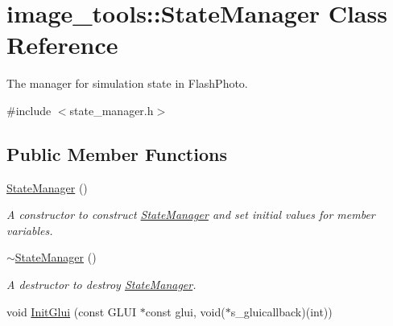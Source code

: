 \hypertarget{classimage__tools_1_1StateManager}{}\section{image\+\_\+tools\+:\+:State\+Manager Class Reference}
\label{classimage__tools_1_1StateManager}


The manager for simulation state in Flash\+Photo.  




{\ttfamily \#include $<$state\+\_\+manager.\+h$>$}

\subsection*{Public Member Functions}
\begin{DoxyCompactItemize}
\item 
\hyperlink{classimage__tools_1_1StateManager_a0937cf067ae3ffd58d75ad05004c4a31}{State\+Manager} ()\hypertarget{classimage__tools_1_1StateManager_a0937cf067ae3ffd58d75ad05004c4a31}{}\label{classimage__tools_1_1StateManager_a0937cf067ae3ffd58d75ad05004c4a31}

\begin{DoxyCompactList}\small\item\em A constructor to construct \hyperlink{classimage__tools_1_1StateManager}{State\+Manager} and set initial values for member variables. \end{DoxyCompactList}\item 
\hyperlink{classimage__tools_1_1StateManager_a12c0b94bff26e5dc6b023f29d90d59b3}{$\sim$\+State\+Manager} ()\hypertarget{classimage__tools_1_1StateManager_a12c0b94bff26e5dc6b023f29d90d59b3}{}\label{classimage__tools_1_1StateManager_a12c0b94bff26e5dc6b023f29d90d59b3}

\begin{DoxyCompactList}\small\item\em A destructor to destroy \hyperlink{classimage__tools_1_1StateManager}{State\+Manager}. \end{DoxyCompactList}\item 
void \hyperlink{classimage__tools_1_1StateManager_ac386ffcf7c1c43570ef07e5a67bf01ac}{Init\+Glui} (const G\+L\+UI $\ast$const glui, void($\ast$s\+\_\+gluicallback)(int))\hypertarget{classimage__tools_1_1StateManager_ac386ffcf7c1c43570ef07e5a67bf01ac}{}\label{classimage__tools_1_1StateManager_ac386ffcf7c1c43570ef07e5a67bf01ac}


\end{DoxyCompactItemize}
